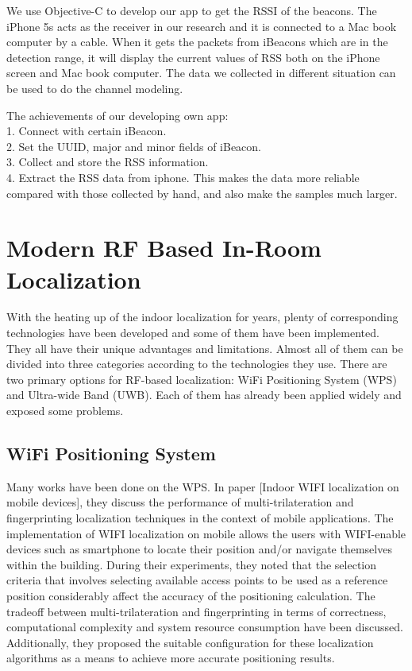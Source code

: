 \documentclass[12pt]{report}
\begin{document}
We use Objective-C to develop our app to get the RSSI of the beacons. The iPhone 5s acts as the receiver in our research and it is connected to a Mac book computer by a cable. When it gets the packets from iBeacons which are in the detection range, it will display the current values of RSS both on the iPhone screen and Mac book computer. The data we collected in different situation can be used to do the channel modeling. 

The achievements of our developing own app:\\
1. Connect with certain iBeacon.\\
2. Set the UUID, major and minor fields of iBeacon.\\
3. Collect and store the RSS information.\\
4. Extract the RSS data from iphone. This makes the data more reliable compared with those collected by hand, and also make the samples much larger.

\section{Modern RF Based In-Room Localization}
With the heating up of the indoor localization for years, plenty of corresponding technologies have been developed and some of them have been implemented. They all have their unique advantages and limitations. Almost all of them can be divided into three categories according to the technologies they use. There are two primary options for RF-based localization: WiFi Positioning System (WPS) and Ultra-wide Band (UWB). Each of them has already been applied widely and exposed some problems. 

\subsection{WiFi Positioning System}
Many works have been done on the WPS. In paper [Indoor WIFI localization on mobile devices], they discuss the performance of multi-trilateration and fingerprinting localization techniques in the context of mobile applications. The implementation of WIFI localization on mobile allows the users with WIFI-enable devices such as smartphone to locate their position and/or navigate themselves within the building. During their experiments, they noted that the selection criteria that involves selecting available access points to be used as a reference position considerably affect the accuracy of the positioning calculation. The tradeoff between multi-trilateration and fingerprinting in terms of correctness, computational complexity and system resource consumption have been discussed. Additionally, they proposed the suitable configuration for these localization algorithms as a means to achieve more accurate positioning results.
\end{document}
